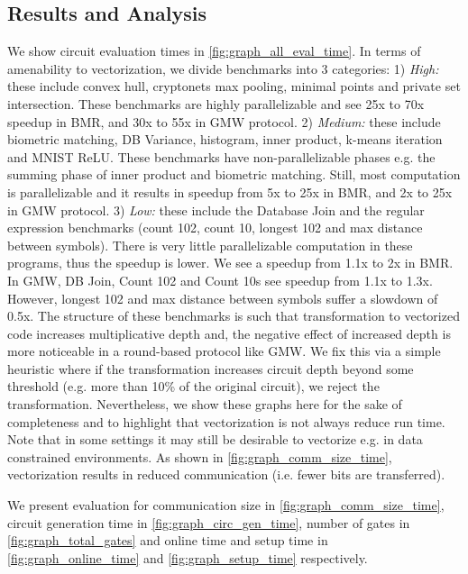 \subsection{Results and Analysis}\label{sec:result_analysis}

\begin{figure*}[htbp]
\centering

\caption{Circuit Evaluation Time (Setup + Online) of Benchmarks}
\label{fig:graph_all_eval_time}
\end{figure*}

We show circuit evaluation times in \cref{fig:graph_all_eval_time}. In terms of amenability to vectorization, we divide benchmarks into 3 categories: 1) {\it High:} these include convex hull, cryptonets max pooling, minimal points and private set intersection. These benchmarks are highly parallelizable and see 25x to 70x speedup in BMR, and 30x to 55x in GMW protocol. 2) {\it Medium:} these include biometric matching, DB Variance, histogram, inner product, k-means iteration and MNIST ReLU. These benchmarks have non-parallelizable phases e.g. the summing phase of inner product and biometric matching. Still, most computation is parallelizable and it results in speedup from 5x to 25x in BMR, and 2x to 25x in GMW protocol. 3) {\it Low:} these include the Database Join and the regular expression benchmarks (count 102, count 10, longest 102 and max distance between symbols). There is very little parallelizable computation in these programs, thus the speedup is lower. We see a speedup from 1.1x to 2x in BMR. In GMW, DB Join, Count 102 and Count 10s see speedup from 1.1x to 1.3x. However, longest 102 and max distance between symbols suffer a slowdown of 0.5x. The structure of these benchmarks is such that transformation to vectorized code increases multiplicative depth and, the negative effect of increased depth is more noticeable in a round-based protocol like GMW. We fix this via a simple heuristic where if the transformation increases circuit depth beyond some threshold (e.g. more than 10\% of the original circuit), we reject the transformation. Nevertheless, we show these graphs here for the sake of completeness and to highlight that vectorization is not always reduce run time. Note that in some settings it may still be desirable to vectorize e.g. in data constrained environments. As shown in \cref{fig:graph_comm_size_time}, vectorization results in reduced communication (i.e. fewer bits are transferred).

We present evaluation for communication size in \cref{fig:graph_comm_size_time}, circuit generation time in \cref{fig:graph_circ_gen_time}, number of gates in \cref{fig:graph_total_gates} and online time and setup time in \cref{fig:graph_online_time} and \cref{fig:graph_setup_time} respectively. 

